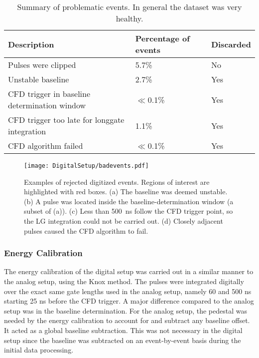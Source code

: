 \documentclass[main.tex]{subfiles}
\begin{document}
\begin{table}[]
\begin{tabular}{|l|l|l|}
\hline
Description                          & Percentage of events & Discarded \\ \hline
Pulses were clipped                           & 5.7\%                          & No                 \\ \hline
Unstable baseline                             & 2.7\%                        & Yes                \\ \hline
CFD trigger in baseline determination window  & $\ll$0.1\%                      & Yes                \\ \hline
CFD trigger too late for longgate integration & 1.1\%                         & Yes                \\ \hline
CFD algorithm failed                          & $\ll$0.1\%                    & Yes                \\ \hline

\end{tabular}
\caption[Summary of problematic events.]{Summary of problematic events. In general the dataset was very healthy.}
\label{tab:badevents}
\end{table}

\begin{figure}[ht!]
    \centering
        \texttt{[image: DigitalSetup/badevents.pdf]}
        \caption[Examples of rejected digitized events.]{Examples of rejected digitized events. Regions of interest are highlighted with red boxes. (a) The baseline was deemed unstable. (b) A pulse was located inside the baseline-determination window (a subset of (a)). (c) Less than \SI{500}{ns} follow the CFD trigger point, so the LG integration could not be carried out. (d) Closely adjacent pulses caused the CFD algorithm to fail.}
    \label{fig:badevents} 
\end{figure}
\newpage
\subsubsection{Energy Calibration}\label{sec:Ecal_D}
The energy calibration of the digital setup was carried out in a similar manner to the analog setup, using the Knox method. The pulses were integrated digitally over the exact same gate lengths used in the analog setup, namely 60 and 500 ns starting 25 ns before the CFD trigger. A major difference compared to the analog setup was in the baseline determination. For the analog setup, the pedestal was needed by the energy calibration to account for and subtract any baseline offset. It acted as a global baseline subtraction. This was not necessary in the digital setup since the baseline was subtracted on an event-by-event basis during the initial data processing. 
\end{document}
